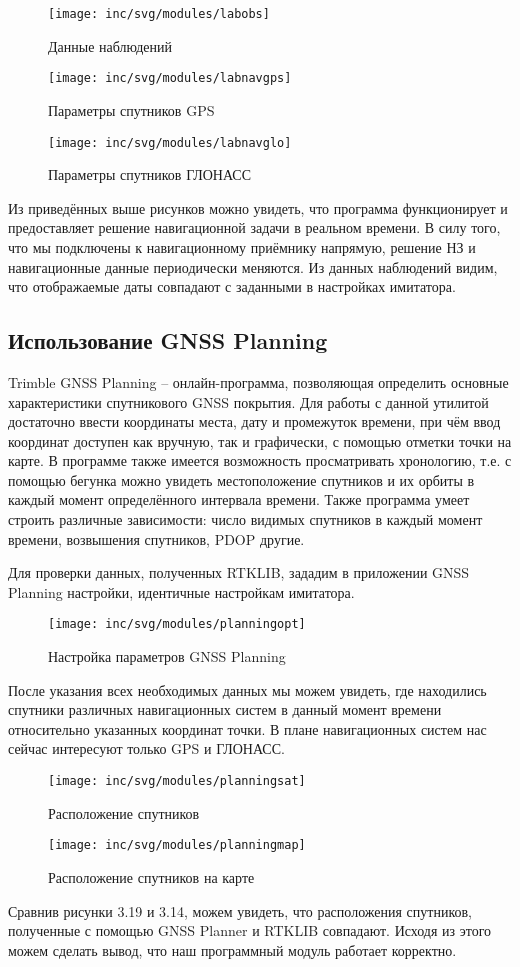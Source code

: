 \begin{figure}[h!]
	\centering
	\texttt{[image: inc/svg/modules/labobs]}
	\caption{Данные наблюдений}
	\label{fig:labobs}
\end{figure}
\begin{figure}[h!]
	\centering
	\texttt{[image: inc/svg/modules/labnavgps]}
	\caption{Параметры спутников GPS}
	\label{fig:labnavgps}
\end{figure}
\begin{figure}[h!]
	\centering
	\texttt{[image: inc/svg/modules/labnavglo]}
	\caption{Параметры спутников ГЛОНАСС}
	\label{fig:labnavglo}
\end{figure}
\clearpage

Из приведённых выше рисунков можно увидеть, что программа функционирует и предоставляет решение навигационной задачи в реальном времени. В силу того, что мы подключены к навигационному приёмнику напрямую, решение НЗ и навигационные данные периодически меняются. Из данных наблюдений видим, что отображаемые даты совпадают с заданными в настройках имитатора.
\subsection{Использование GNSS Planning}
Trimble GNSS Planning -- онлайн-программа, позволяющая определить основные характеристики спутникового GNSS покрытия. Для работы с данной утилитой достаточно ввести координаты места, дату и промежуток времени, при чём ввод координат доступен как вручную, так и графически, с помощью отметки точки на карте. В программе также имеется возможность просматривать хронологию, т.е. с помощью бегунка можно увидеть местоположение спутников и их орбиты в каждый момент определённого интервала времени. Также программа умеет строить различные зависимости: число видимых спутников в каждый момент времени, возвышения спутников, PDOP  другие.

Для проверки данных, полученных RTKLIB, зададим в приложении GNSS Planning настройки, идентичные настройкам имитатора.
\begin{figure}[h!]
	\centering
	\texttt{[image: inc/svg/modules/planningopt]}
	\caption{Настройка параметров GNSS Planning}
	\label{fig:planningopt}
\end{figure}

После указания всех необходимых данных мы можем увидеть, где находились спутники различных навигационных систем в данный момент времени относительно указанных координат точки. В плане навигационных систем нас сейчас интересуют только GPS и ГЛОНАСС.
\begin{figure}[h!]
	\centering
	\texttt{[image: inc/svg/modules/planningsat]}
	\caption{Расположение спутников}
	\label{fig:planningsat}
\end{figure}
\begin{figure}[h!]
	\centering
	\texttt{[image: inc/svg/modules/planningmap]}
	\caption{Расположение спутников на карте}
	\label{fig:planningmap}
\end{figure}

Сравнив рисунки 3.19 и 3.14, можем увидеть, что расположения спутников, полученные с помощью GNSS Planner и RTKLIB совпадают. Исходя из этого можем сделать вывод, что наш программный модуль работает корректно.